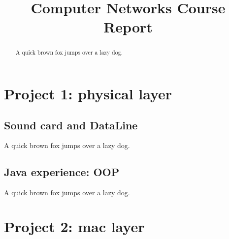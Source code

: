\documentclass[conference,compsoc]{IEEEtran}
\begin{document}
\title{
	Computer Networks Course Report
}
\author{
\and
}

\maketitle

\begin{abstract}
A quick brown fox jumps over a lazy dog.
\end{abstract}

\section{Project 1: physical layer}
	
	\subsection{Sound card and DataLine}
		A quick brown fox jumps over a lazy dog.
	
	\subsection{Java experience: OOP}
		A quick brown fox jumps over a lazy dog.

\section{Project 2: mac layer}
	
\end{document}
